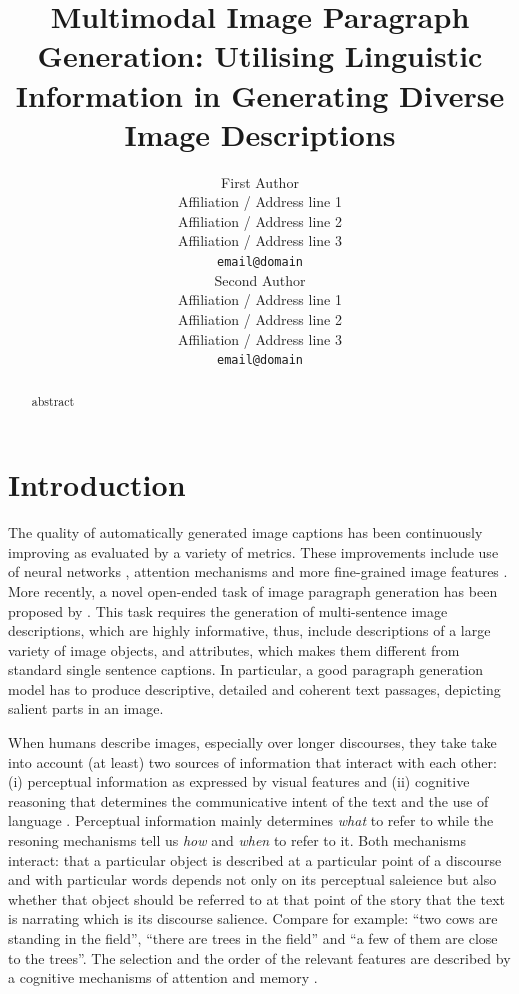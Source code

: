 \documentclass[11pt,a4paper]{article}
\title{Multimodal Image Paragraph Generation: Utilising Linguistic Information in Generating Diverse Image Descriptions}
\author{First Author \\
 Affiliation / Address line 1 \\
 Affiliation / Address line 2 \\
 Affiliation / Address line 3 \\
 \texttt{email@domain} \\\And
 Second Author \\
 Affiliation / Address line 1 \\
 Affiliation / Address line 2 \\
 Affiliation / Address line 3 \\
 \texttt{email@domain} \\}
\date{}
\begin{document}
\maketitle
\begin{abstract}
abstract

\end{abstract}

\section{Introduction}

The quality of automatically generated image captions \cite{bernardi2016automatic} has been continuously improving as evaluated by a variety of metrics.
These improvements include use of neural networks \cite{kiros14,vinyals2014tell}, attention mechanisms \cite{xu2015attend,Lu2016} and more fine-grained image features \cite{anderson2017bottomup}.
More recently, a novel open-ended task of image paragraph generation has been proposed by .
This task requires the generation of multi-sentence image descriptions, which are highly informative, thus, include descriptions of a large variety of image objects, and attributes, which makes them different from standard single sentence captions.
In particular, a good paragraph generation model has to produce descriptive, detailed and coherent text passages, depicting salient parts in an image.

When humans describe images, especially over longer discourses, they take take into account (at least) two sources of information that interact with each other: (i) perceptual information as expressed by visual features and (ii) cognitive reasoning that determines the communicative intent of the text and the use of language \cite{Kelleher:2020aa}.
Perceptual information mainly determines \emph{what} to refer to while the resoning mechanisms tell us \emph{how} and \emph{when} to refer to it.
Both mechanisms interact: that a particular object is described at a particular point of a discourse and with particular words depends not only on its perceptual saleience but also whether that object should be referred to at that point of the story that the text is narrating which is its discourse salience.
Compare for example: ``two cows are standing in the field'', ``there are trees in the field'' and ``a few of them are close to the trees''.
The selection and the order of the relevant features are described by a cognitive mechanisms of attention and memory \cite{Lavie:2004aa,Dobnik:2016ac}.
\end{document}
